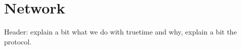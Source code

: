 \chapter{Network}

Header: explain a bit what we do with truetime and why, explain a bit the protocol.